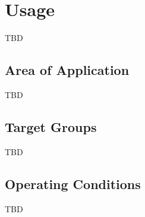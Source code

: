 \section{Usage}
TBD

\subsection{Area of Application}
TBD

\subsection{Target Groups}
TBD

\subsection{Operating Conditions}
TBD
